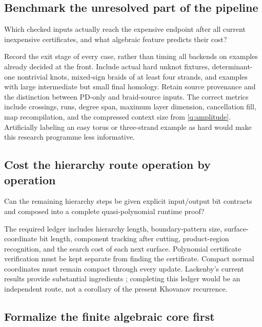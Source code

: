 \subsection{Benchmark the unresolved part of the pipeline}

\begin{question}\label{q:corpus}
Which checked inputs actually reach the expensive endpoint after all
current inexpensive certificates, and what algebraic feature predicts
their cost?
\end{question}

Record the exit stage of every case, rather than timing all backends
on examples already decided at the front. Include actual hard unknot
fixtures, determinant-one nontrivial knots, mixed-sign braids of at
least four strands, and examples with large intermediate but small
final homology. Retain source provenance and the distinction between
PD-only and braid-source inputs.
The correct metrics include crossings, runs, degree span, maximum
layer dimension, cancellation fill, map recompilation, and the
compressed context size from \cref{q:amplitude}.
Artificially labeling an easy torus or three-strand example as hard
would make this research programme less informative.

\subsection{Cost the hierarchy route operation by operation}

\begin{question}\label{q:hierarchy}
Can the remaining hierarchy steps be given explicit input/output bit
contracts and composed into a complete quasi-polynomial runtime proof?
\end{question}

The required ledger includes hierarchy length, boundary-pattern size,
surface-coordinate bit length, component tracking after cutting,
product-region recognition, and the search cost of each next surface.
Polynomial certificate verification must be kept separate from finding
the certificate. Compact normal coordinates must remain compact through
every update.
Lackenby's current results provide substantial ingredients
\cite{lackenby26}; completing this ledger would be an independent route,
not a corollary of the present Khovanov recurrence.

\subsection{Formalize the finite algebraic core first}

